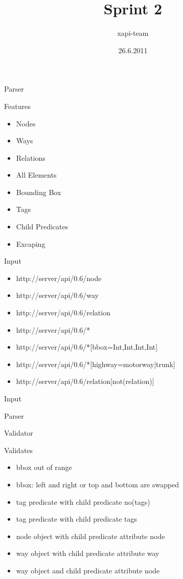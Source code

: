 \documentclass{beamer}
\title{Sprint 2}
\author{xapi-team}
\institute{Institute for Computer Science, Free University Berlin}
\date{26.6.2011}
\begin{document}
\begin{frame}
\titlepage
\end{frame}

\begin{frame}{Parser}
    \begin{block}{Features}
        \begin{itemize}
            \item Nodes
            \item Ways
            \item Relations
            \item All Elements
            \item Bounding Box
            \item Tags
            \item Child Predicates
            \item Excaping
        \end{itemize}
    \end{block}

    \begin{block}{Input}
        \begin{itemize}
            \item http://server/api/0.6/node
            \item http://server/api/0.6/way
            \item http://server/api/0.6/relation
            \item http://server/api/0.6/*
            \item http://server/api/0.6/*[bbox=Int,Int,Int,Int]
            \item http://server/api/0.6/*[highway=motorway|trunk]
            \item http://server/api/0.6/relation[not(relation)]
        \end{itemize}
    \end{block}{Input}
\end{frame}{Parser}

\begin{frame}{Validator}

    \begin{block}{Validates}
        \begin{itemize}
            \item bbox out of range
            \item bbox: left and right or top and bottom are swapped
            \item tag predicate with child predicate no(tags)
            \item tag predicate with child predicate tags
            \item node object with child predicate attribute node
            \item way object with child predicate attribute way
            \item way object and child predicate attribute node
        \end{itemize}
    \end{block}

\end{frame}
\end{document}

